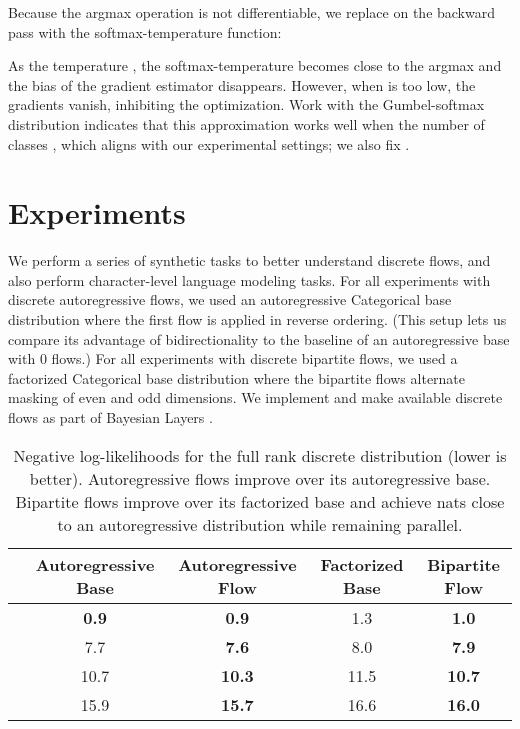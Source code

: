 \documentclass{article}
\begin{document}
Because the argmax operation is not differentiable, we replace  on the backward pass with the softmax-temperature function:

As the temperature , the softmax-temperature becomes close to the argmax and the bias of the gradient estimator disappears. However, when  is too low, the gradients vanish, inhibiting the optimization.
Work with the Gumbel-softmax distribution indicates that this approximation works well when the number of classes  \citep{maddison2016concrete,jang2017categorical}, which aligns with our experimental settings; we also fix
.









\section{Experiments}
\label{sec:experiments}

We perform a series of synthetic tasks to better understand discrete flows, and also perform character-level language modeling tasks. For all experiments with discrete autoregressive flows, we used an autoregressive Categorical base distribution where the first flow is applied in reverse ordering. (This setup lets us compare its advantage of bidirectionality to the baseline of an autoregressive base with 0 flows.) For all experiments with discrete bipartite flows, we used a factorized Categorical base distribution where the bipartite flows alternate masking of even and odd dimensions.
We implement and make available discrete flows as part of Bayesian Layers \citep{tran2018bayesian}.






\begin{table*}[!t]
\centering
\begin{tabular}{lcccc} \\  \toprule
& Autoregressive Base & Autoregressive Flow & Factorized Base & Bipartite Flow \\ \midrule
  & \textbf{0.9} & \textbf{0.9} & 1.3 & \textbf{1.0} \\
  & 7.7 & \textbf{7.6} & 8.0 & \textbf{7.9} \\
 & 10.7 & \textbf{10.3} & 11.5 & \textbf{10.7} \\
 & 15.9 & \textbf{15.7} & 16.6 & \textbf{16.0} \\
\bottomrule
\end{tabular}
\caption{Negative log-likelihoods for the full rank discrete distribution (lower is better). Autoregressive flows improve over its autoregressive base. Bipartite flows improve over its factorized base and achieve nats close to an autoregressive distribution while remaining parallel.}
\label{table:full_rank}
\end{table*}
\end{document}
